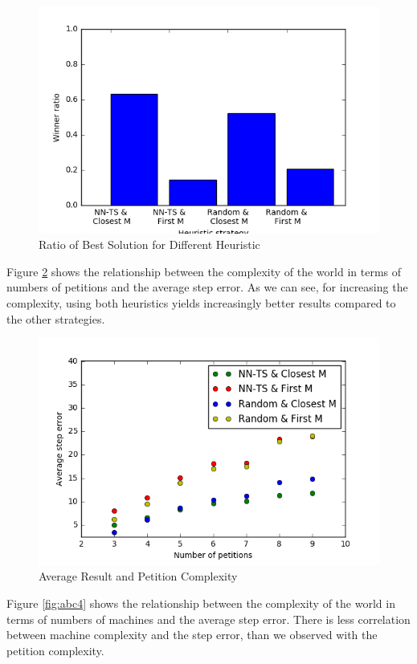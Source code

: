 \begin{figure}[!hbt]
  \includegraphics[width=1.1\textwidth]{img/winner_ratio_vs_heuristic}
  \caption{Ratio of Best Solution for Different Heuristic}
  \label{fig:abc2}
\end{figure}

Figure \ref{fig:abc3} shows the relationship between the complexity of the world in terms of numbers of petitions and the average step error. As we can see, for increasing the complexity, using both heuristics yields increasingly better results compared to the other strategies.

\begin{figure}[!hbt]
  \includegraphics[width=1.1\textwidth]{img/avg_error_vs_petitions}
  \caption{Average Result and Petition Complexity}
  \label{fig:abc3}
\end{figure}

Figure \ref{fig:abc4} shows the relationship between the complexity of the world in terms of numbers of machines and the average step error. There is less correlation between machine complexity and the step error, than we observed with the petition complexity.


